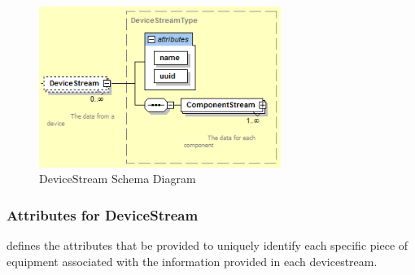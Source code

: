 \documentclass{mtconnect}	%
\begin{document}
\begin{figure}[ht]
  \centering
  \includegraphics[width=0.7\textwidth]{figures/devicestream-schema-diagram.png}
  \caption{DeviceStream Schema Diagram}
  \label{fig:devicestream-schema-diagram}
\end{figure}
\FloatBarrier

\subsubsection{Attributes for DeviceStream}

 defines the attributes that \must be provided to uniquely identify each specific piece of equipment associated with the information provided in each \gls{devicestream}.
\end{document}
